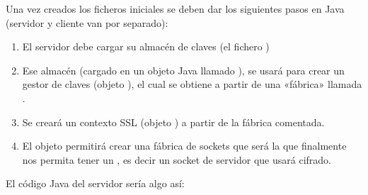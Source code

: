 \documentclass[letterpaper,10pt,spanish]{sphinxmanual}
\begin{document}
Una vez creados los ficheros iniciales se deben dar los siguientes pasos en Java (servidor y cliente van por separado):
\begin{enumerate}
%
\item {} 
El servidor debe cargar su almacén de claves (el fichero )

\item {} 
Ese almacén (cargado en un objeto Java llamado ), se usará para crear un gestor de claves (objeto ), el cual se obtiene a partir de una «fábrica» llamada .

\item {} 
Se creará un contexto SSL (objeto ) a partir de la fábrica comentada.

\item {} 
El objeto  permitirá crear una fábrica de sockets que será la que finalmente nos permita tener un , es decir un socket de servidor que usará cifrado.

\end{enumerate}

El código Java del servidor sería algo así:
\end{document}

